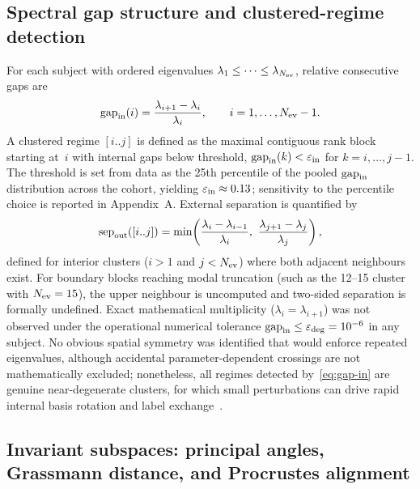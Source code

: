 \documentclass[11pt]{article}
\begin{document}
\subsection{Spectral gap structure and clustered-regime detection}
\label{sec:gaps}

For each subject with ordered eigenvalues $\lambda_1\le\cdots\le\lambda_{N_{\rm ev}}$, relative consecutive gaps are
\begin{equation}
\mathrm{gap}_{\rm in}(i)=\frac{\lambda_{i+1}-\lambda_i}{\lambda_i},\qquad i=1,\ldots,N_{\rm ev}-1.
\label{eq:gap-in}
\end{equation}
A clustered regime $[i..j]$ is defined as the maximal contiguous rank block starting at~$i$ with internal gaps below threshold, $\mathrm{gap}_{\rm in}(k)<\varepsilon_{\rm in}$ for $k=i,\ldots,j-1$.
The threshold is set from data as the 25th percentile of the pooled $\mathrm{gap}_{\rm in}$ distribution across the cohort, yielding $\varepsilon_{\rm in}\approx 0.13$; sensitivity to the percentile choice is reported in Appendix~A.
External separation is quantified by
\begin{equation}
\mathrm{sep}_{\rm out}([i..j])=\min\!\left(\frac{\lambda_i-\lambda_{i-1}}{\lambda_i},\ \frac{\lambda_{j+1}-\lambda_j}{\lambda_j}\right),
\label{eq:sep-out}
\end{equation}
defined for interior clusters ($i > 1$ and $j < N_{\rm ev}$) where both adjacent neighbours exist. For boundary blocks reaching modal truncation (such as the 12--15 cluster with $N_{\rm ev}=15$), the upper neighbour is uncomputed and two-sided separation is formally undefined.
Exact mathematical multiplicity ($\lambda_i = \lambda_{i+1}$) was not observed under the operational numerical tolerance $\mathrm{gap}_{\rm in}\le\varepsilon_{\rm deg}=10^{-6}$ in any subject. No obvious spatial symmetry was identified that would enforce repeated eigenvalues, although accidental parameter-dependent crossings are not mathematically excluded; nonetheless, all regimes detected by~\eqref{eq:gap-in} are genuine near-degenerate clusters, for which small perturbations can drive rapid internal basis rotation and label exchange~\citep{Pierre1988,ManconiMace2017}.

\subsection{Invariant subspaces: principal angles, Grassmann distance, and Procrustes alignment}
\label{sec:subspace-methods}
\end{document}
